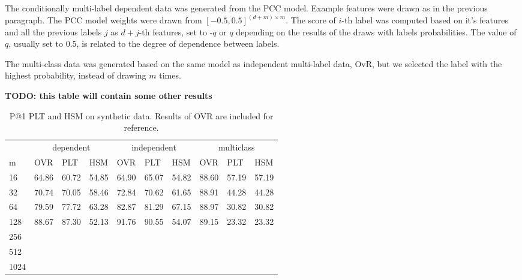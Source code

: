 \documentclass{article}
\begin{document}
The conditionally multi-label dependent data was generated from the PCC \cite{!} model. Example features were drawn as in the previous paragraph. The PCC model weights were drawn from  $[-0.5, 0.5]^{(d + m) \times m}$.
The score of $i$-th label was computed based on it's features and all the previous labels $j$ as $d+j$-th features, set to -$q$ or $q$ depending on the results of the draws with labels probabilities. The value of $q$, usually set to $0.5$, is related to the degree of dependence between labels.

The multi-class data was generated based on the same model as independent multi-label data, OvR, but we selected the label with the highest probability, instead of drawing $m$ times. 

\textbf{TODO: this table will contain some other results}

\begin{table*}[]
	\centering
	\caption{P@1 PLT and HSM on synthetic data. Results of OVR are included for reference.}
	\label{tab:synthetic1}
\begin{tabular}{l|lll|lll|lll}
	& \multicolumn{3}{c|}{dependent} & \multicolumn{3}{c|}{independent} & \multicolumn{3}{c}{multiclass} \\
	m    & OVR      & PLT      & HSM     & OVR       & PLT      & HSM      & OVR      & PLT      & HSM      \\
	\midrule
	16   & 64.86   & 60.72   & 54.85  & 64.90    & 65.07   & 54.82   & 88.60   & 57.19   & 57.19   \\
	32   & 70.74   & 70.05   & 58.46  & 72.84    & 70.62   & 61.65   & 88.91   & 44.28   & 44.28   \\
	64   & 79.59   & 77.72   & 63.28  & 82.87    & 81.29   & 67.15   & 88.97   & 30.82   & 30.82   \\
	128  & 88.67   & 87.30   & 52.13  & 91.76    & 90.55   & 54.07   & 89.15   & 23.32   & 23.32   \\
	256  &          &          &         &           &          &          &          &          &          \\
	512  &          &          &         &           &          &          &          &          &          \\
	1024 &          &          &         &           &          &          &          &          &         
\end{tabular}
	
\end{table*}
\end{document}
